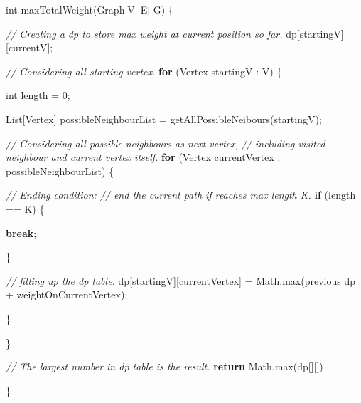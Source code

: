 \documentclass[
]{article}
\author{}
\date{}
\newenvironment{Shaded}{}{}
\newcommand{\BuiltInTok}[1]{#1}
\newcommand{\CommentTok}[1]{\textcolor[rgb]{0.38,0.63,0.69}{\textit{#1}}}
\newcommand{\ControlFlowTok}[1]{\textcolor[rgb]{0.00,0.44,0.13}{\textbf{#1}}}
\newcommand{\DataTypeTok}[1]{\textcolor[rgb]{0.56,0.13,0.00}{#1}}
\newcommand{\DecValTok}[1]{\textcolor[rgb]{0.25,0.63,0.44}{#1}}
\newcommand{\FunctionTok}[1]{\textcolor[rgb]{0.02,0.16,0.49}{#1}}
\newcommand{\NormalTok}[1]{#1}
\newcommand{\OperatorTok}[1]{\textcolor[rgb]{0.40,0.40,0.40}{#1}}
\begin{document}
\begin{Shaded}
\begin{Highlighting}[]
\DataTypeTok{int} \FunctionTok{maxTotalWeight}\OperatorTok{(}\NormalTok{Graph}\OperatorTok{[}\NormalTok{V}\OperatorTok{][}\NormalTok{E}\OperatorTok{]}\NormalTok{ G}\OperatorTok{)} \OperatorTok{\{}

    \CommentTok{// Creating a dp to store max weight at current position so far.
}
\NormalTok{    dp}\OperatorTok{[}\NormalTok{startingV}\OperatorTok{][}\NormalTok{currentV}\OperatorTok{];}

    \CommentTok{// Considering all starting vertex.
}
    \ControlFlowTok{for} \OperatorTok{(}\NormalTok{Vertex startingV }\OperatorTok{:}\NormalTok{ V}\OperatorTok{)} \OperatorTok{\{}

        \DataTypeTok{int}\NormalTok{ length }\OperatorTok{=} \DecValTok{0}\OperatorTok{;}

        \BuiltInTok{List}\OperatorTok{[}\NormalTok{Vertex}\OperatorTok{]}\NormalTok{ possibleNeighbourList }\OperatorTok{=} \FunctionTok{getAllPossibleNeibours}\OperatorTok{(}\NormalTok{startingV}\OperatorTok{);}

        \CommentTok{// Considering all possible neighbours as next vertex,
}
        \CommentTok{// including visited neighbour and current vertex itself.
}
        \ControlFlowTok{for} \OperatorTok{(}\NormalTok{Vertex currentVertex }\OperatorTok{:}\NormalTok{ possibleNeighbourList}\OperatorTok{)} \OperatorTok{\{}

            \CommentTok{// Ending condition: 
}
            \CommentTok{// end the current path if reaches max length K.
}
            \ControlFlowTok{if} \OperatorTok{(}\NormalTok{length }\OperatorTok{==}\NormalTok{ K}\OperatorTok{)} \OperatorTok{\{}

                \ControlFlowTok{break}\OperatorTok{;}

            \OperatorTok{\}}

            \CommentTok{// filling up the dp table.
}
\NormalTok{            dp}\OperatorTok{[}\NormalTok{startingV}\OperatorTok{][}\NormalTok{currentVertex}\OperatorTok{]} \OperatorTok{=} \BuiltInTok{Math}\OperatorTok{.}\FunctionTok{max}\OperatorTok{(}\NormalTok{previous dp }\OperatorTok{+}\NormalTok{ weightOnCurrentVertex}\OperatorTok{);}

        \OperatorTok{\}}

    \OperatorTok{\}}

    \CommentTok{// The largest number in dp table is the result.
}
    \ControlFlowTok{return} \BuiltInTok{Math}\OperatorTok{.}\FunctionTok{max}\OperatorTok{(}\NormalTok{dp}\OperatorTok{[][])}

\OperatorTok{\}}
\end{Highlighting}
\end{Shaded}
\end{document}
